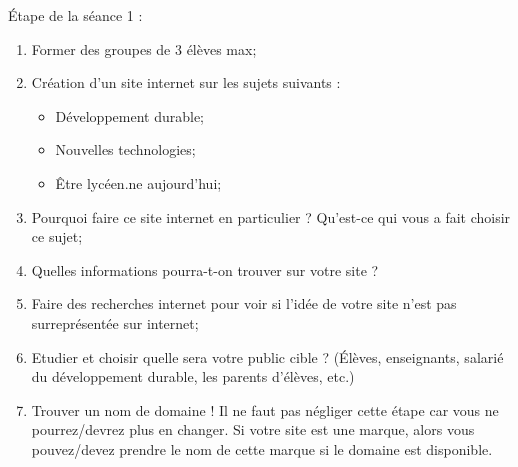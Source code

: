 \documentclass[12pt,a4paper]{article} %
\begin{document}
Étape de la séance 1 : 
\begin{enumerate}
\item Former des groupes de 3 élèves max;
\vspace{1cm}
\item Création d’un site internet sur les sujets suivants :


\begin{itemize}
\item Développement durable;
\item Nouvelles technologies;
\item Être lycéen.ne aujourd'hui;
\end{itemize}
\vspace{1cm}
\item Pourquoi faire ce site internet en particulier ? Qu’est-ce qui vous a fait choisir ce sujet;





\item Quelles informations pourra-t-on trouver sur votre site ?





\item Faire des recherches internet pour voir si l’idée de votre site n’est pas surreprésentée sur internet;
\vspace{1cm}
\item Etudier et choisir quelle sera votre public cible ? (Élèves, enseignants, salarié du développement durable, les parents d’élèves, etc.)




\item Trouver un nom de domaine ! Il ne faut pas négliger cette étape car vous ne pourrez/devrez plus en changer. Si votre site est une marque, alors vous pouvez/devez prendre le nom de cette marque si le domaine est disponible. 



\end{enumerate}
\end{document}
